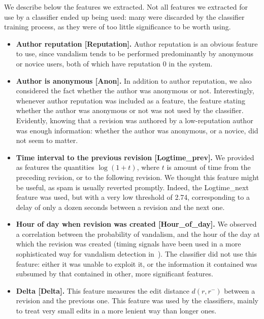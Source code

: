 We describe below the features we extracted.
Not all features we extracted for use by a classifier ended up being used: many were discarded by the classifier training process, as they were of too little significance to be worth using.
%
\begin{itemize}

\item \textbf{Author reputation [Reputation].}  Author reputation is an obvious feature to use, since vandalism tends to be performed predominantly by anonymous or novice users, both of which have reputation 0 in the system.

\item \textbf{Author is anonymous [Anon].}  In addition to author reputation, we also considered the fact whether the author was anonymous or not.
Interestingly, whenever author reputation was included as a feature, the feature stating whether the author was anonymous or not was not used by the classifier.
Evidently, knowing that a revision was authored by a low-reputation author was enough information: whether the author was anonymous, or a novice, did not seem to matter.

\item \textbf{Time interval to the previous revision [Logtime\_prev].}
We provided as features the quantities $\log(1 + t)$, where $t$ is amount of time from the preceding revision, or to the following revision.
We thought this feature might be useful, as spam is usually reverted promptly.
Indeed, the Logtime\_next feature was used, but with a very low threshold of 2.74, corresponding to a delay of only a dozen seconds between a revision and the next one.

\item \textbf{Hour of day when revision was created [Hour\_of\_day].}
We observed a correlation between the probability of vandalism, and the hour of the day at which the revision was created (timing signals have been used in a more sophisticated way for vandalism detection in~\cite{West2010}).  The classifier did not use this feature: either it was unable to exploit it, or the information it contained was subsumed by that contained in other, more significant features.

\item \textbf{Delta [Delta].}  This feature measures the edit distance $d(r, r^{-})$ between a revision and the previous one.  This feature was used by the classifiers, mainly to treat very small edits in a more lenient way than longer ones.


\end{itemize}
